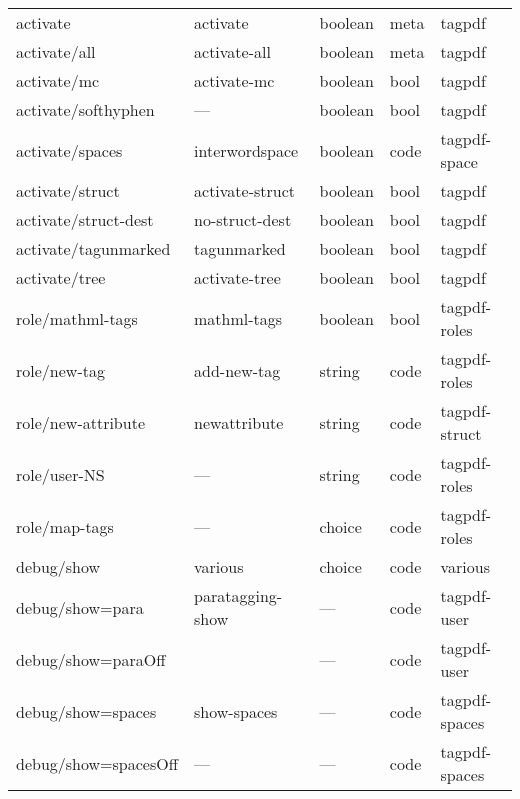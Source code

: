 \begin{longtable}{lllll}
activate        & activate        & boolean         &meta  & tagpdf \\
activate/all    & activate-all    & boolean         &meta & tagpdf\\
activate/mc     & activate-mc     & boolean         &bool  & tagpdf\\
activate/softhyphen & ---         & boolean         &bool  & tagpdf \\    
activate/spaces & interwordspace  & boolean         &code  & tagpdf-space\\
activate/struct & activate-struct & boolean         &bool  & tagpdf\\  
activate/struct-dest & no-struct-dest&boolean       &bool  & tagpdf\\
activate/tagunmarked& tagunmarked & boolean         &bool & tagpdf\\
activate/tree   & activate-tree   & boolean         &bool  & tagpdf\\[4pt]\midrule  
role/mathml-tags & mathml-tags    & boolean          &bool  & tagpdf-roles\\
role/new-tag     & add-new-tag    & string           &code  & tagpdf-roles\\
role/new-attribute&newattribute   & string           &code  & tagpdf-struct\\
role/user-NS     & ---            & string           &code  & tagpdf-roles\\ 
role/map-tags      & ---            & choice           & code & tagpdf-roles\\[4pt]\midrule
debug/show       &various          &choice            &code  & various \\ 
debug/show=para  & paratagging-show&    ---           &code  & tagpdf-user\\
debug/show=paraOff&                &    ---           &code  & tagpdf-user\\
debug/show=spaces & show-spaces    &    ---           &code  & tagpdf-spaces\\
debug/show=spacesOff& ---          &    ---           &code  & tagpdf-spaces\\

\end{longtable}
